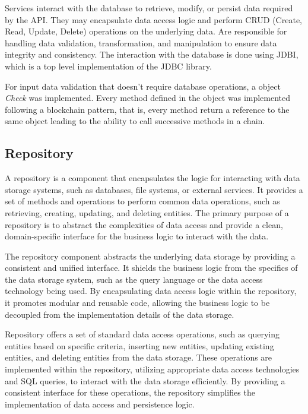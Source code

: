 Services interact with the database to retrieve, modify, or persist data required by the API. They may encapsulate data access logic and perform CRUD (Create, Read, Update, Delete) operations on the underlying data. Are responsible for handling data validation, transformation, and manipulation to ensure data integrity and consistency.
The interaction with the database is done using JDBI, which is a top level implementation of the JDBC library.

For input data validation that doesn't require database operations, a object \textit{Check} was implemented. Every method defined in the object was implemented following a blockchain pattern, that is, every method return a reference to the same object leading to the ability to call successive methods in a chain.     

\subsection{Repository}
A repository is a component that encapsulates the logic for interacting with data storage systems, such as databases, file systems, or external services. It provides a set of methods and operations to perform common data operations, such as retrieving, creating, updating, and deleting entities. The primary purpose of a repository is to abstract the complexities of data access and provide a clean, domain-specific interface for the business logic to interact with the data.

The repository component abstracts the underlying data storage by providing a consistent and unified interface. It shields the business logic from the specifics of the data storage system, such as the query language or the data access technology being used. By encapsulating data access logic within the repository, it promotes modular and reusable code, allowing the business logic to be decoupled from the implementation details of the data storage.

Repository offers a set of standard data access operations, such as querying entities based on specific criteria, inserting new entities, updating existing entities, and deleting entities from the data storage. These operations are implemented within the repository, utilizing appropriate data access technologies and SQL queries, to interact with the data storage efficiently. By providing a consistent interface for these operations, the repository simplifies the implementation of data access and persistence logic.

